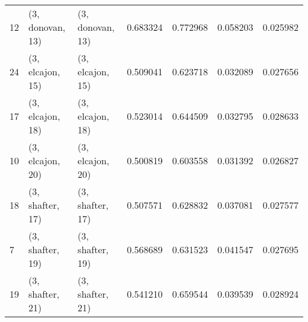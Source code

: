 \begin{tabular}{lllrrrr}
12 &  (3, donovan, 13) &  (3, donovan, 13) &  0.683324 &  0.772968 &   0.058203 &  0.025982 \\
24 &  (3, elcajon, 15) &  (3, elcajon, 15) &  0.509041 &  0.623718 &   0.032089 &  0.027656 \\
17 &  (3, elcajon, 18) &  (3, elcajon, 18) &  0.523014 &  0.644509 &   0.032795 &  0.028633 \\
10 &  (3, elcajon, 20) &  (3, elcajon, 20) &  0.500819 &  0.603558 &   0.031392 &  0.026827 \\
18 &  (3, shafter, 17) &  (3, shafter, 17) &  0.507571 &  0.628832 &   0.037081 &  0.027577 \\
7  &  (3, shafter, 19) &  (3, shafter, 19) &  0.568689 &  0.631523 &   0.041547 &  0.027695 \\
19 &  (3, shafter, 21) &  (3, shafter, 21) &  0.541210 &  0.659544 &   0.039539 &  0.028924 \\
\bottomrule
\end{tabular}
